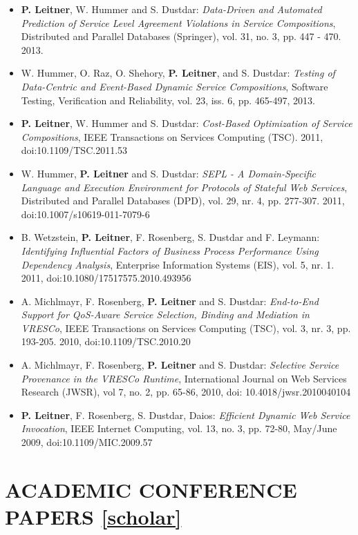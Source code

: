 \documentclass[paper=letter,fontsize=11pt]{scrartcl} %
\newcommand{\NewPart}[2]{\section*{\uppercase{#1} #2}}
\begin{document}
\begin{itemize}
  \item \textbf{P. Leitner}, W. Hummer and S. Dustdar: \emph{Data-Driven and Automated Prediction of Service Level Agreement Violations in Service Compositions}, Distributed and Parallel Databases (Springer), vol. 31, no. 3, pp. 447 - 470. 2013. 
  \item W. Hummer, O. Raz, O. Shehory, \textbf{P. Leitner}, and S. Dustdar: \emph{Testing of Data-Centric and Event-Based Dynamic Service Compositions}, Software Testing, Verification and Reliability, vol. 23, iss. 6, pp. 465-497, 2013. 
  \item \textbf{P. Leitner}, W. Hummer and S. Dustdar: \emph{Cost-Based
  Optimization of Service Compositions}, IEEE Transactions on Services Computing (TSC). 2011, doi:10.1109/TSC.2011.53
\item W. Hummer, \textbf{P. Leitner} and S. Dustdar: \emph{SEPL - A
Domain-Specific Language and Execution Environment for Protocols of Stateful Web
Services}, Distributed and Parallel Databases (DPD), vol. 29, nr. 4, pp.
277-307. 2011, doi:10.1007/s10619-011-7079-6
\item B. Wetzstein, \textbf{P. Leitner}, F. Rosenberg, S. Dustdar and F. Leymann: \emph{Identifying Influential Factors of Business Process Performance Using Dependency Analysis}, Enterprise Information Systems (EIS), vol. 5, nr. 1. 2011, doi:10.1080/17517575.2010.493956
\item A. Michlmayr, F. Rosenberg, \textbf{P. Leitner} and S. Dustdar: \emph{End-to-End Support for QoS-Aware Service Selection, Binding and Mediation in VRESCo}, IEEE Transactions on Services Computing (TSC), vol. 3, nr. 3, pp. 193-205. 2010, doi:10.1109/TSC.2010.20
\item A. Michlmayr, F. Rosenberg, \textbf{P. Leitner} and S. Dustdar: \emph{Selective Service Provenance in the VRESCo Runtime}, International Journal on Web Services Research (JWSR), vol 7, no. 2, pp. 65-86, 2010, doi: 10.4018/jwsr.2010040104
\item \textbf{P. Leitner}, F. Rosenberg, S. Dustdar, Daios: \emph{Efficient Dynamic Web Service Invocation}, IEEE Internet Computing, vol. 13, no. 3, pp. 72-80, May/June 2009, doi:10.1109/MIC.2009.57
\end{itemize}

\NewPart{Academic Conference Papers}{\href{https://scholar.google.ch/citations?user=wZ9f8CAAAAAJ}{[scholar]}}
\end{document}
